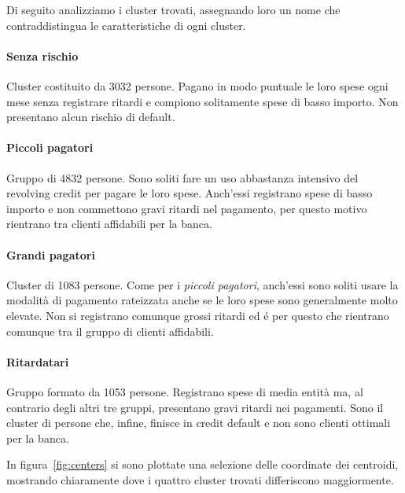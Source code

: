 Di seguito analizziamo i cluster trovati, assegnando loro 
un nome che contraddistingua le caratteristiche 
di ogni cluster.

\paragraph{Senza rischio}
Cluster costituito da 3032 persone. Pagano in modo puntuale
le loro spese ogni mese senza registrare ritardi e compiono 
solitamente spese di basso importo. Non presentano alcun rischio di default.

\paragraph{Piccoli pagatori}
Gruppo di 4832 persone. Sono soliti fare un uso abbastanza 
intensivo del revolving credit per pagare le loro spese. 
Anch'essi registrano spese di basso importo e non commettono
gravi ritardi nel pagamento, per questo motivo rientrano tra
clienti affidabili per la banca.

\paragraph{Grandi pagatori}
Cluster di 1083 persone. Come per i \textit{piccoli pagatori}, 
anch'essi sono soliti usare la modalit\`a di pagamento 
rateizzata anche se le loro spese sono generalmente molto elevate.
Non si registrano comunque grossi ritardi ed \'e per questo che
rientrano comunque tra il gruppo di clienti affidabili.

\paragraph{Ritardatari}
Gruppo formato da 1053 persone. Registrano spese di media entit\`a
ma, al contrario degli altri tre gruppi, presentano gravi ritardi
nei pagamenti. Sono il cluster di persone che, infine, finisce in
credit default e non sono clienti ottimali per la banca.

In figura~\ref{fig:centers} si sono plottate una selezione
delle coordinate dei centroidi, mostrando chiaramente dove i quattro
cluster trovati differiscono maggiormente.

